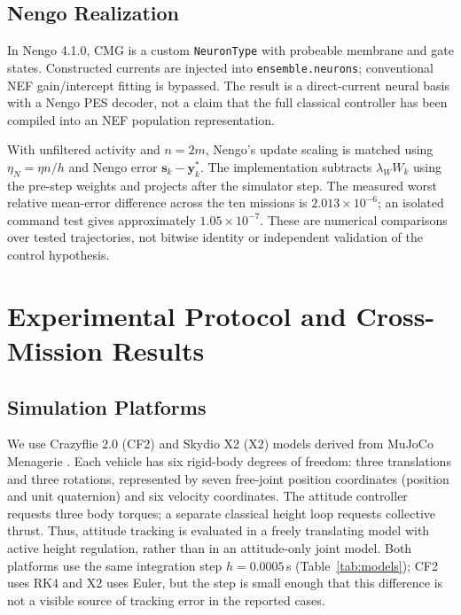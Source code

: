 \documentclass[letterpaper, 10 pt, conference]{ieeeconf}
\begin{document}
\subsection{Nengo Realization}
In Nengo 4.1.0, CMG is a custom \texttt{NeuronType} with
probeable membrane and gate states. Constructed currents are injected into
\texttt{ensemble.neurons}; conventional NEF gain/intercept fitting is
bypassed. The result is a direct-current neural basis with a Nengo PES
decoder, not a claim that the full classical controller has been compiled
into an NEF population representation.

With unfiltered activity and $n=2m$, Nengo's update scaling is matched using
$\eta_N=\eta n/h$ and Nengo error $\bm s_k-\bm y_k^*$.
The implementation subtracts $\lambda_WW_k$ using the pre-step weights
and projects after the simulator step. The measured worst relative
mean-error difference across the ten missions is $2.013\times10^{-6}$;
an isolated command test gives approximately $1.05\times10^{-7}$.
These are numerical comparisons over tested trajectories, not bitwise
identity or independent validation of the control hypothesis.

\section{Experimental Protocol and Cross-Mission Results}
\label{sec:results}
\subsection{Simulation Platforms}
\label{sec:simsetup}
We use Crazyflie 2.0 (CF2) and Skydio X2 (X2) models derived from MuJoCo
Menagerie \cite{menagerieModels}. Each vehicle has six rigid-body degrees of freedom: three
translations and three rotations, represented by seven free-joint position
coordinates (position and unit quaternion) and six velocity coordinates.
The attitude controller requests three body torques; a separate classical
height loop requests collective thrust. Thus, attitude tracking is evaluated in a freely translating model with active height regulation, rather than in an attitude-only joint model. Both
platforms use the same integration step $h=0.0005$\,s (Table~\ref{tab:models});
CF2 uses RK4 and X2 uses Euler, but the step is small enough that this
difference is not a visible source of tracking error in the reported cases.
\end{document}
